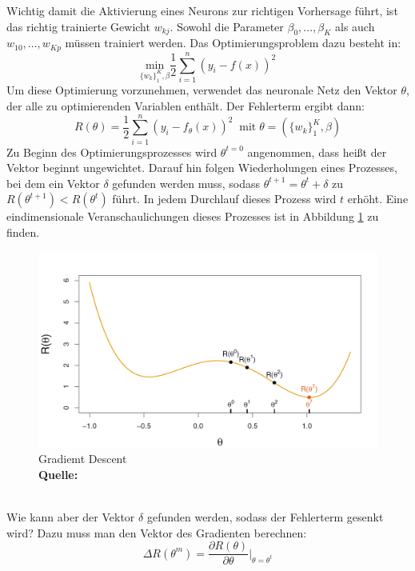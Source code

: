 \documentclass[a4paper,12pt]{thesis}
\newcommand*{\captionsource}[2]{%
	\caption[{#1}]{%
		#1%
		\\\hspace{\linewidth}%
		\textbf{Quelle:} #2%
	}%
}
\begin{document}
Wichtig damit die Aktivierung eines Neurons zur richtigen Vorhersage führt, ist das richtig trainierte Gewicht $w_{kj}$. Sowohl die Parameter $\beta_0, ..., \beta_K$ als auch $w_{10}, ..., w_{Kp}$ müssen trainiert werden. Das Optimierungsproblem dazu besteht in:
\begin{equation}
	\label{NN:Optimization}
	\underset{ \{ w_k \}^K_1 , \beta }{\text{min}}\frac{1}{2}\sum_{i=1}^n (y_i-f(x))^2
\end{equation}
Um diese Optimierung vorzunehmen, verwendet das neuronale Netz den Vektor $\theta$, der alle zu optimierenden Variablen enthält. Der Fehlerterm ergibt dann:
\begin{equation}
	\label{NN:ErrorTerm}
	R(\theta)=\frac{1}{2}\sum_{i=1}^n (y_i-f_{\theta}(x))^2 \; \; \text{mit} \; \theta=(\{ w_k \}^K_1,\beta)
\end{equation}
Zu Beginn des Optimierungsprozesses wird $\theta^{t=0}$ angenommen, dass heißt der Vektor beginnt ungewichtet. Darauf hin folgen Wiederholungen eines Prozesses, bei dem ein Vektor $\delta$ gefunden werden muss, sodass $\theta^{t+1}=\theta^t + \delta$ zu $R(\theta^{t+1})<R(\theta^t)$ führt. In jedem Durchlauf dieses Prozess wird $t$ erhöht. Eine eindimensionale Veranschaulichungen dieses Prozesses ist in Abbildung \ref{NN3} zu finden.
\begin{figure}[!ht]
	\centering
	\includegraphics[width=14cm]{Plots/NN3.png}
	\captionsource{Gradiemt Descent}{
		\cite{James2013DL}
	}
	\label{NN3}
\end{figure}\\
Wie kann aber der Vektor $\delta$ gefunden werden, sodass der Fehlerterm gesenkt wird? Dazu muss man den Vektor des Gradienten berechnen:
\begin{equation}
	\label{NN:GradientVector}
	\Delta R(\theta^m)=\frac{\partial R(\theta)}{\partial \theta}|_{\theta=\theta^t}
\end{equation}
\end{document}
